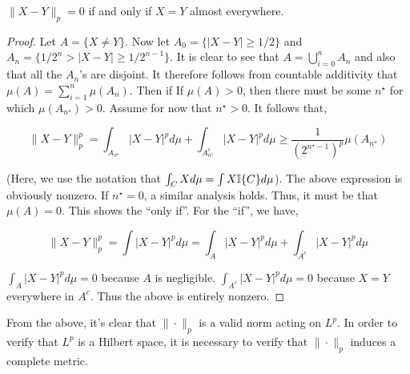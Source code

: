     \begin{theorem}
        $\|X-Y\|_p = 0$ if and only if $X = Y$ almost everywhere.
    \end{theorem}
    \begin{proof}
        Let $A = \{X \neq Y\}$. Now let $A_0=\{|X-Y| \geq 1/2\}$ and $A_n = \{1/2^n > |X - Y| \geq 1/2^{n-1}\}$. It is clear to see that 
        $A = \bigcup_{i=0}^n A_n$ and also that all the $A_n$'s are disjoint. It therefore follows 
        from countable additivity that $\mu(A) = \sum_{i=1}^n \mu(A_n)$. Then if 
        If $\mu(A) > 0$, then there must be some $n^\star$ for which $\mu(A_{n^\star}) > 0$.
        Assume for now that $n^\star > 0$. It follows that, 

        \[ \|X-Y\|_p^p = \int_{A_{n^\star}} |X-Y|^pd\mu + \int_{A_{n^\star}^c} |X-Y|^p d\mu \geq \frac{1}{(2^{n^\star - 1})^p}\mu(A_{n^\star})  \]

        (Here, we use the notation that $\int_C Xd\mu = \int X \mathbb I\{C\}d\mu$). 
        The above expression is obviously nonzero. If $n^\star = 0$, a similar analysis 
        holds. Thus, it must be that $\mu(A) = 0$. This shows the ``only if''. For the ``if'', we have,

        \[ \|X-Y\|_p^p = \int |X-Y|^p d\mu =  \int_A |X-Y|^p d\mu + \int_{A^c} |X-Y|^p d\mu\]

        $\int_A |X-Y|^p d\mu = 0$ because $A$ is negligible. $\int_{A^c} |X-Y|^p d\mu = 0$ because 
        $X=Y$ everywhere in $A^c$. Thus the above is entirely nonzero. 
    \end{proof}

    From the above, it's clear that $\|\cdot\|_p$ is a valid norm acting on $L^p$. In order to verify that 
    $L^p$ is a Hilbert space, it is necessary to verify that $\|\cdot\|_p$ induces a complete metric. 

